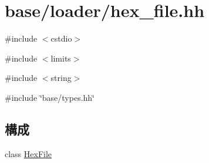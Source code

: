\hypertarget{hex__file_8hh}{
\section{base/loader/hex\_\-file.hh}
\label{hex__file_8hh}
}
{\ttfamily \#include $<$cstdio$>$}\par
{\ttfamily \#include $<$limits$>$}\par
{\ttfamily \#include $<$string$>$}\par
{\ttfamily \#include \char`\"{}base/types.hh\char`\"{}}\par
\subsection*{構成}
\begin{DoxyCompactItemize}
\item 
class \hyperlink{classHexFile}{HexFile}
\end{DoxyCompactItemize}

